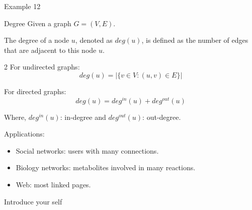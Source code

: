 \documentclass[aspectratio=169]{beamer}
\begin{document}
    \begin{frame}{Example 12}
        \begin{exampleblock}{Degree}
            Given a graph $G = (V, E)$.

            The degree of a node $u$, denoted as $deg(u)$, is defined as the number of edges that are adjacent to this node $u$.
        \end{exampleblock}

        \begin{multicols}{2} %
            For undirected graphs:
            \begin{equation}
                deg(u) = \left|\{v \in V : (u, v) \in E\}\right|
            \end{equation}
        
            For directed graphs:
            \begin{equation}
                deg(u) = deg^{in}(u) + deg^{out}(u)
            \end{equation}
        \end{multicols}
        
        Where, $deg^{in}(u)$: in-degree and $deg^{out}(u)$: out-degree. \newline

        Applications:
        \begin{itemize}
            \item Social networks: users with many connections.
            \item Biology networks: metabolites involved in many reactions.
            \item Web: most linked pages.
        \end{itemize}

        \begin{note}
            {Introduce your self}
        \end{note}
    \end{frame}
\end{document}

